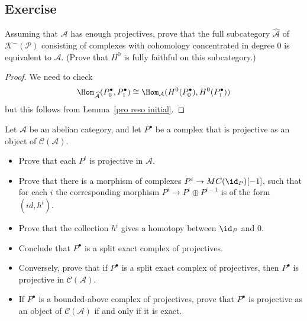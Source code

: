 \subsection{Exercise}
\begin{exercise}
Assuming that $\mathcal{A}$ has enough projectives, prove that the full subcategory $\widehat{\mathcal{A}}$ of $\mathcal{K}^-(\mathcal{P})$ consisting of complexes with cohomology concentrated in degree $0$ is equivalent to $\mathcal{A}$. (Prove that $H^0$ is fully faithful on this subcategory.)
\end{exercise}
\begin{proof}
We need to check
\[\Hom_{\widehat{\mathcal{A}}}(P_0^\bullet,P_1^\bullet)\cong\Hom_\mathcal{A}(H^0(P_0^\bullet),H^0(P_1^\bullet))\]
but this follows from Lemma~\ref{pro reso initial}.
\end{proof}
\begin{exercise}
Let $\mathcal{A}$ be an abelian category, and let $P^\bullet$ be a complex that is projective as an object of $\mathcal{C}(\mathcal{A})$.
\begin{itemize}
\item Prove that each $P^i$ is projective in $\mathcal{A}$.
\item Prove that there is a morphism of complexes $P^i\to MC(\id_P)[-1]$, such that for each $i$ the corresponding morphism $P^i\to P^i\oplus P^{i-1}$ is of the form $(id,h^i)$.
\item Prove that the collection $h^i$ gives a homotopy between $\id_P$ and $0$.
\item Conclude that $P^\bullet$ is a split exact complex of projectives.
\item Conversely, prove that if $P^\bullet$ is a split exact complex of projectives, then $P^\bullet$
is projective in $\mathcal{C}(\mathcal{A})$.
\item If $P^\bullet$ is a bounded-above complex of projectives, prove that $P^\bullet$ is projective as
an object of $\mathcal{C}(\mathcal{A})$ if and only if it is exact.
\end{itemize}
\end{exercise}
